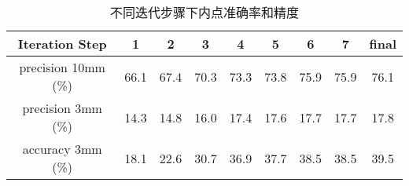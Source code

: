 \begin{table}[t]
  \centering
  \begin{tabular}{c|c|c|c|c|c|c|c|c}
    \toprule
    Iteration Step & 1 & 2 & 3 & 4 & 5 & 6 & 7 & final \\
    \midrule
    precision 10mm (\%) & 66.1 &67.4 &70.3 &73.3 &73.8 &75.9 &75.9 &76.1\\
    precision 3mm (\%) & 14.3 &14.8 &16.0 &17.4 &17.6 &17.7 &17.7 &17.8\\
    accuracy 3mm (\%)& 18.1 &22.6 &30.7 &36.9 &37.7 &38.5 &38.5 &39.5\\
    \bottomrule
  \end{tabular}
  \caption{不同迭代步骤下内点准确率和精度}
  \label{tab:ourlier_removal_metrics}
\end{table}





